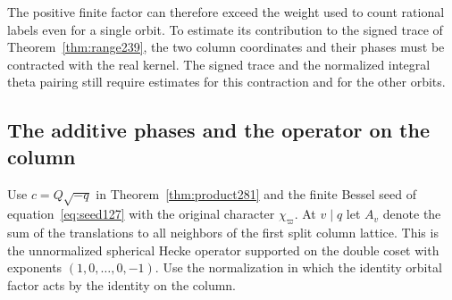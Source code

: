 \documentclass[a4paper,11pt]{article}
\theoremstyle{definition}
\theoremstyle{remark}
\numberwithin{equation}{section}
\begin{document}
The positive finite factor can therefore exceed the weight used
to count rational labels even for a single orbit. To estimate
its contribution to the signed trace of
Theorem~\ref{thm:range239}, the two column coordinates and
their phases must be contracted with the real kernel.
The signed trace and the normalized integral theta pairing
still require estimates for this contraction and for the other orbits.

\subsection{The additive phases and the operator on the column}\label{nav:IX-49}
Use \(c=Q\sqrt{-q}\) in Theorem~\ref{thm:product281} and
the finite Bessel seed of equation~\eqref{eq:seed127} with
the original character \(\chi_\varpi\). At \(v\mid q\)
let \(A_v\) denote the sum of the translations to all
neighbors of the first split column lattice. This is the
unnormalized spherical Hecke operator supported on the
double coset with exponents \((1,0,\ldots,0,-1)\).
Use the normalization in which the identity orbital factor
acts by the identity on the column.
\end{document}
